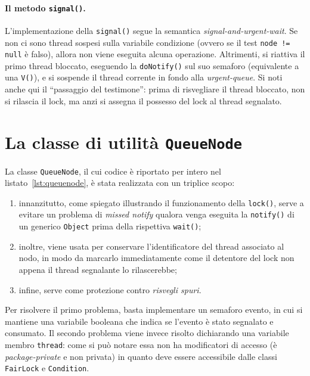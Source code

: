 \documentclass[a4paper,twoside]{article}
\newcommand\code{\lstinline[basicstyle=\normalsize\ttfamily]}
\begin{document}
\paragraph{Il metodo \texttt{signal()}.}
L'implementazione della \code|signal()| segue la semantica \emph{signal-and-urgent-wait}. Se non ci sono thread sospesi sulla variabile condizione (ovvero se il test \code|node != null| è falso), allora non viene eseguita alcuna operazione. Altrimenti, si riattiva il primo thread bloccato, eseguendo la \code|doNotify()| sul suo semaforo (equivalente a una \code|V()|), e si sospende il thread corrente in fondo alla \emph{urgent-queue}. Si noti anche qui il “passaggio del testimone”: prima di risvegliare il thread bloccato, non si rilascia il lock, ma anzi si assegna il possesso del lock al thread segnalato.


\section{La classe di utilità \texttt{QueueNode}}

La classe \code|QueueNode|, il cui codice è riportato per intero nel listato~\ref{lst:queuenode}, è stata realizzata con un triplice scopo:
\begin{enumerate}
\item innanzitutto, come spiegato illustrando il funzionamento della \code|lock()|, serve a evitare un problema di \emph{missed notify} qualora venga eseguita la \code|notify()| di un generico \code|Object| prima della rispettiva \code|wait()|;
\item inoltre, viene usata per conservare l'identificatore del thread associato al nodo, in modo da marcarlo immediatamente come il detentore del lock non appena il thread segnalante lo rilascerebbe;
\item infine, serve come protezione contro \emph{risvegli spuri}.
\end{enumerate}



Per risolvere il primo problema, basta implementare un semaforo evento, in cui si mantiene una variabile booleana che indica se l'evento è stato segnalato e consumato. Il secondo problema viene invece risolto dichiarando una variabile membro \code|thread|: come si può notare essa non ha modificatori di accesso (è \emph{package-private} e non privata) in quanto deve essere accessibile dalle classi \code|FairLock| e \code|Condition|.
\end{document}
